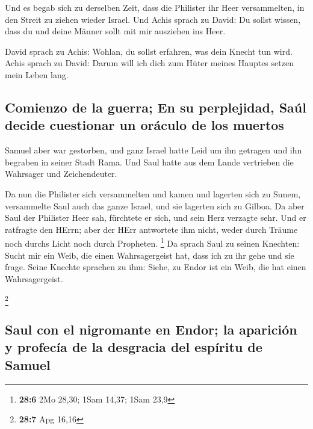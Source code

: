  Und es begab sich zu derselben Zeit, dass die Philister
ihr Heer versammelten, in den Streit zu ziehen wieder Israel. Und Achis
sprach zu David: Du sollst wissen, dass du und deine Männer sollt mit
mir ausziehen ins Heer.

 David sprach zu Achis: Wohlan, du sollst erfahren, was
dein Knecht tun wird. Achis sprach zu David: Darum will ich dich zum
Hüter meines Hauptes setzen mein Leben lang.

\hypertarget{comienzo-de-la-guerra-en-su-perplejidad-sauxfal-decide-cuestionar-un-oruxe1culo-de-los-muertos}{%
\subsection{Comienzo de la guerra; En su perplejidad, Saúl decide
cuestionar un oráculo de los
muertos}\label{comienzo-de-la-guerra-en-su-perplejidad-sauxfal-decide-cuestionar-un-oruxe1culo-de-los-muertos}}

 Samuel aber war gestorben, und ganz Israel hatte Leid um
ihn getragen und ihn begraben in seiner Stadt Rama. Und Saul hatte aus
dem Lande vertrieben die Wahrsager und Zeichendeuter.

 Da nun die Philister sich versammelten und kamen und
lagerten sich zu Sunem, versammelte Saul auch das ganze Israel, und sie
lagerten sich zu Gilboa.  Da aber Saul der Philister Heer
sah, fürchtete er sich, und sein Herz verzagte sehr.  Und
er ratfragte den HErrn; aber der HErr antwortete ihm nicht, weder durch
Träume noch durchs Licht noch durch Propheten. \footnote{\textbf{28:6}
  2Mo 28,30; 1Sam 14,37; 1Sam 23,9}  Da sprach Saul zu
seinen Knechten: Sucht mir ein Weib, die einen Wahrsagergeist hat, dass
ich zu ihr gehe und sie frage. Seine Knechte sprachen zu ihm: Siehe, zu
Endor ist ein Weib, die hat einen Wahrsagergeist.

\footnote{\textbf{28:7} Apg 16,16}

\hypertarget{saul-con-el-nigromante-en-endor-la-apariciuxf3n-y-profecuxeda-de-la-desgracia-del-espuxedritu-de-samuel}{%
\subsection{Saul con el nigromante en Endor; la aparición y profecía de
la desgracia del espíritu de
Samuel}\label{saul-con-el-nigromante-en-endor-la-apariciuxf3n-y-profecuxeda-de-la-desgracia-del-espuxedritu-de-samuel}}

